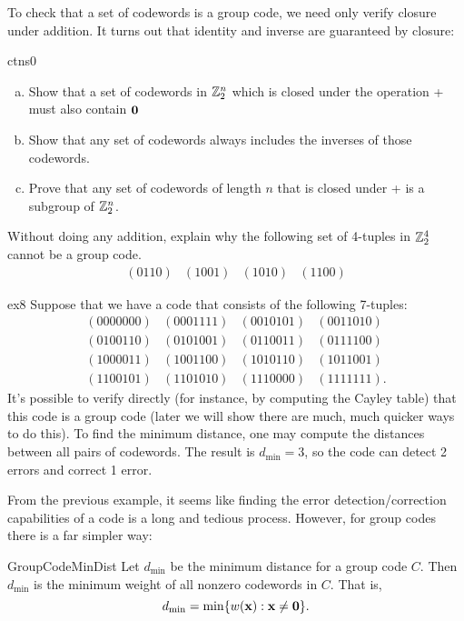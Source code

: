  To check that a set of codewords is a group code, we need only verify closure under addition. It turns out that identity and inverse are guaranteed by closure:

\begin{exercise}{ctns0}
\begin{enumerate}[(a)]
\item
Show that a set of codewords in
${\Bbb Z}_2^n$ which is closed under the operation + must also contain ${\bold 0}$ 
\item
Show that any set of codewords always includes the inverses of those codewords.
\item
Prove that any set of codewords of length $n$ that is closed under + is a subgroup of ${\Bbb Z}_2^n$.
\end{enumerate}
\end{exercise} 
 
\begin{exercise}{}
Without doing any addition, explain why the following set of 4-tuples in
${\Bbb Z}_2^4$ cannot be a group code. 
\[
\begin{array}{cccc}
(0110) & (1001) & (1010) & (1100)
\end{array}
\]
 \end{exercise}

 
\begin{example}{ex8}
Suppose that we have a code that consists of the following 7-tuples: 
\[
\begin{array}{cccc}
(0000000) & (0001111) & (0010101) & (0011010) \\
(0100110) & (0101001) & (0110011) & (0111100) \\
(1000011) & (1001100) & (1010110) & (1011001) \\
(1100101) & (1101010) & (1110000) & (1111111).
\end{array}
\]
It's possible to verify directly (for instance, by computing the Cayley table) that this code 
is a group code (later we will show there are much, much quicker ways to do this).
To find the minimum distance, one may compute the distances
between all pairs of codewords. The result is $d_{\min} = 3$, so the code can detect 2 errors and correct 1 error.  
\end{example}
 From the previous example, it seems like finding the error detection/correction capabilities of a code is a long and tedious process. However, for group codes there is a far simpler way:
 
\begin{prop}{GroupCodeMinDist}
Let $d_{\min}$ be the minimum distance for a group code $C$. Then
$d_{\min}$ is the minimum weight of all nonzero
codewords in $C$. That is, 
\[
d_{\min} = \min\{ w({\bold x}) : { {\bold x} \neq {\bold 0}
} \}.
\]
\end{prop}
  
